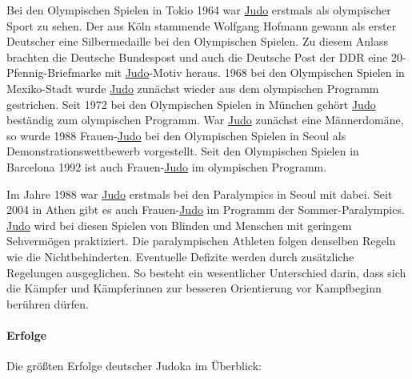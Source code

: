 \documentclass[justified, a4paper, notitlepage, captions=tableheading, nobib]{tufte-handout}
\begin{document}
Bei den Olympischen Spielen in Tokio 1964 war \hyperref[org4f88021]{Judo} erstmals als olympischer Sport zu sehen. Der aus Köln stammende Wolfgang Hofmann gewann als erster Deutscher eine Silbermedaille bei den Olympischen Spielen. Zu diesem Anlass brachten die Deutsche Bundespost und auch die Deutsche Post der DDR eine 20-Pfennig-Briefmarke mit \hyperref[org4f88021]{Judo}-Motiv heraus. 1968 bei den Olympischen Spielen in Mexiko-Stadt wurde \hyperref[org4f88021]{Judo} zunächst wieder aus dem olympischen Programm gestrichen. Seit 1972 bei den Olympischen Spielen in München gehört \hyperref[org4f88021]{Judo} beständig zum olympischen Programm. War \hyperref[org4f88021]{Judo} zunächst eine Männerdomäne, so wurde 1988 Frauen-\hyperref[org4f88021]{Judo} bei den Olympischen Spielen in Seoul als Demonstrationswettbewerb vorgestellt. Seit den Olympischen Spielen in Barcelona 1992 ist auch Frauen-\hyperref[org4f88021]{Judo} im olympischen Programm.

Im Jahre 1988 war \hyperref[org4f88021]{Judo} erstmals bei den Paralympics in Seoul mit dabei. Seit 2004 in Athen gibt es auch Frauen-\hyperref[org4f88021]{Judo} im Programm der Sommer-Paralympics. \hyperref[org4f88021]{Judo} wird bei diesen Spielen von Blinden und Menschen mit geringem Sehvermögen praktiziert. Die paralympischen Athleten folgen denselben Regeln wie die Nichtbehinderten. Eventuelle Defizite werden durch zusätzliche Regelungen ausgeglichen. So besteht ein wesentlicher Unterschied darin, dass sich die Kämpfer und Kämpferinnen zur besseren Orientierung vor Kampfbeginn berühren dürfen. 

\paragraph{Erfolge}
\label{sec:orgec69476}
Die größten Erfolge deutscher Judoka im Überblick:
\end{document}
